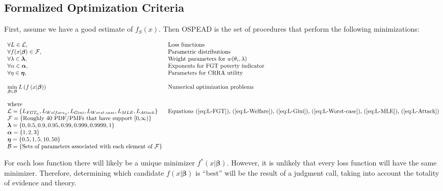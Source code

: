 \documentclass[english]{article}
\begin{document}
\subsection{Formalized Optimization Criteria}

First, assume we have a good estimate of $f_{S}(x)$. Then OSPEAD
is the set of procedures that perform the following minimizations:

\begin{equation}
\begin{array}{ll}
\forall L\in\mathcal{L}, & \textrm{Loss functions}\\
\forall f(x|\boldsymbol{\beta})\in\mathcal{F}, & \textrm{Parametric distributions}\\
\forall\lambda\in\boldsymbol{\lambda}, & \textrm{Weight parameters for }w(\theta_{i},\lambda)\\
\forall\alpha\in\boldsymbol{\alpha}, & \textrm{Exponents for FGT poverty indicator}\\
\forall\eta\in\boldsymbol{\eta}, & \textrm{Parameters for CRRA utility}\\
\\
\underset{\boldsymbol{\beta}\in\mathcal{B}}{\min}\:L\left(f\left(x|\boldsymbol{\beta}\right)\right) & \textrm{Numerical optimization problems}\\
\\
\textrm{where}\\
\mathcal{L}=\{L_{FGT_{\alpha}},L_{Welfare_{\eta}},L_{Gini},L_{Worst\:case},L_{MLE},L_{Attack}\} & \textrm{Equations (\ref{eq:L-FGT}), (\ref{eq:L-Welfare}), (\ref{eq:L-Gini}), (\ref{eq:L-Worst-case}), (\ref{eq:L-MLE}), (\ref{eq:L-Attack})}\\
\mathcal{F}=\left\{ \textrm{Roughly 40 PDF/PMFs that have support [0,\ensuremath{\infty})}\right\} \\
\boldsymbol{\lambda}=\left\{ 0,0.5,0.9,0.95,0.99,0.999,0.9999,1\right\} \\
\boldsymbol{\alpha}=\left\{ 1,2,3\right\} \\
\boldsymbol{\eta}=\left\{ 0.5,1,5,10,50\right\} \\
\mathcal{B}=\left\{ \textrm{Sets of parameters associated with each element of }\mathcal{F}\right\} 
\end{array}\label{eq:OSPEAD}
\end{equation}

For each loss function there will likely be a unique minimizer $f^{*}\!\left(x|\boldsymbol{\beta}\right)$.
However, it is unlikely that every loss function will have the same
minimizer. Therefore, determining which candidate $f\left(x|\boldsymbol{\beta}\right)$
is ``best'' will be the result of a judgment call, taking into account
the totality of evidence and theory.
\end{document}

